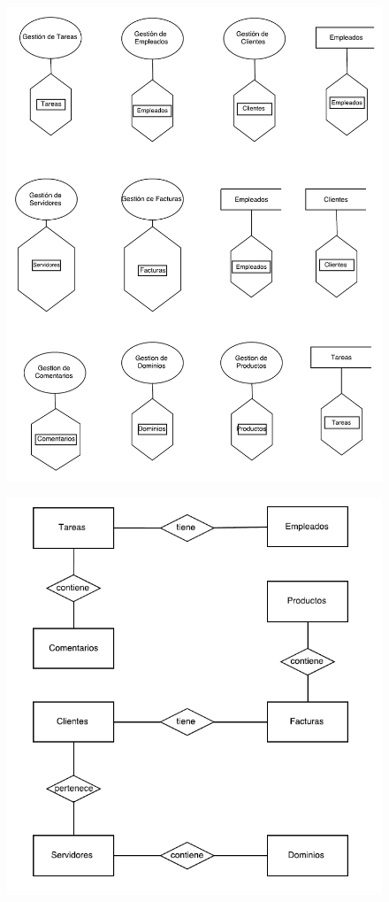 \documentclass[paper=a4, fontsize=11pt, spanish]{scrartcl}
\begin{document}
\begin{figure}
	\includegraphics[width=1.20\textwidth]{EsqExtF_2.png}
	\caption{}
	\label{fig:EsqExtF_2}
\end{figure}

\begin{figure}
	\includegraphics[width=1.20\textwidth]{SegundoRefD.png}
	\caption{}
	\label{fig:SegundoRefD}
\end{figure}
\end{document}
